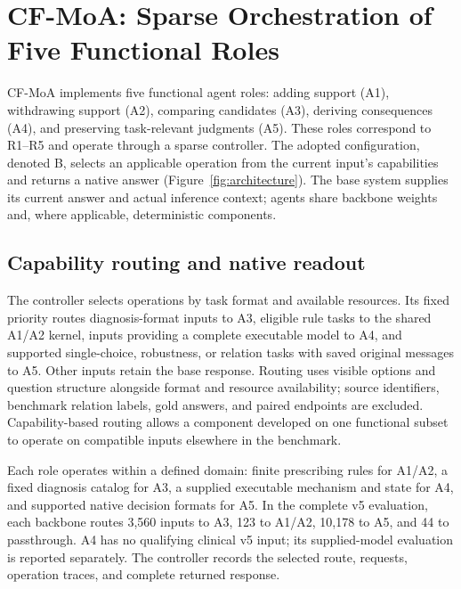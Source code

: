 \section{CF-MoA: Sparse Orchestration of Five Functional Roles}
\label{sec:method}

CF-MoA implements five functional agent roles: adding support (A1), withdrawing support (A2), comparing candidates (A3), deriving consequences (A4), and preserving task-relevant judgments (A5). These roles correspond to R1--R5 and operate through a sparse controller. The adopted configuration, denoted B, selects an applicable operation from the current input's capabilities and returns a native answer (Figure~\ref{fig:architecture}). The base system supplies its current answer and actual inference context; agents share backbone weights and, where applicable, deterministic components.

\subsection{Capability routing and native readout}

The controller selects operations by task format and available resources. Its fixed priority routes diagnosis-format inputs to A3, eligible rule tasks to the shared A1/A2 kernel, inputs providing a complete executable model to A4, and supported single-choice, robustness, or relation tasks with saved original messages to A5. Other inputs retain the base response. Routing uses visible options and question structure alongside format and resource availability; source identifiers, benchmark relation labels, gold answers, and paired endpoints are excluded. Capability-based routing allows a component developed on one functional subset to operate on compatible inputs elsewhere in the benchmark.

Each role operates within a defined domain: finite prescribing rules for A1/A2, a fixed diagnosis catalog for A3, a supplied executable mechanism and state for A4, and supported native decision formats for A5. In the complete v5 evaluation, each backbone routes 3,560 inputs to A3, 123 to A1/A2, 10,178 to A5, and 44 to passthrough. A4 has no qualifying clinical v5 input; its supplied-model evaluation is reported separately. The controller records the selected route, requests, operation traces, and complete returned response.

